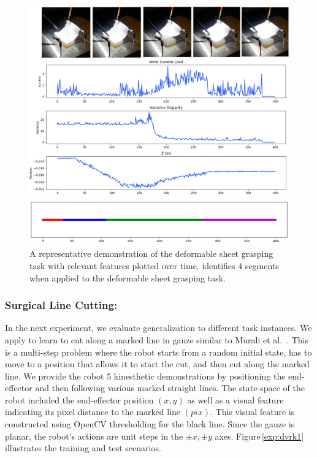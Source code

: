 \begin{figure}[t]

    \includegraphics[width=\columnwidth]{exp/signals.png}
    \raggedright
    \includegraphics[width=0.9\columnwidth]{exp/segmentation.png}
    \caption{A representative demonstration of the deformable sheet grasping task with relevant features plotted over time. \hirl identifies 4 segments when applied to the deformable sheet grasping task. 
    }
    \label{exp:dvrk3}
\end{figure}




\subsubsection{Surgical Line Cutting: }
In the next experiment, we evaluate generalization to different task instances.
We apply \hirl to learn to cut along a marked line in gauze similar to Murali et al.~\cite{murali2015learning}.
This is a multi-step problem where the robot starts from a random initial state, has to move to a position that allows it to start the cut, and then cut along the marked line.
We provide the robot 5 kinesthetic demonstrations by positioning the end-effector and then following various marked straight lines.
The state-space of the robot included the end-effector position $(x,y)$ as well as a visual feature indicating its pixel distance to the marked line $(pix)$.
This visual feature is constructed using OpenCV thresholding for the black line.
Since the gauze is planar, the robot's actions are unit steps in the $\pm x, \pm y$ axes.
Figure\,\ref{exp:dvrk1} illustrates the training and test scenarios.

